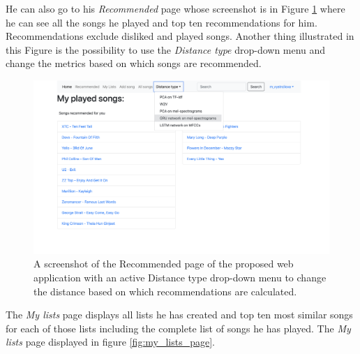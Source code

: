 He can also go to his \textit{Recommended} page whose screenshot is in Figure \ref{fig:recommended_page} where he can see all the songs he played and top ten recommendations for him. Recommendations exclude disliked and played songs. Another thing illustrated in this Figure is the possibility to use the \textit{Distance type} drop-down menu and change the metrics based on which songs are recommended.
\begin{figure}[H]
    \centering
	\includegraphics[width=1\linewidth]{./img/recommended_page.png}
	\caption{A screenshot of the Recommended page of the proposed web application with an active Distance type drop-down menu to change the distance based on which recommendations are calculated.}
	\label{fig:recommended_page}
\end{figure}
The \textit{My lists} page displays all lists he has created and top ten most similar songs for each of those lists including the complete list of songs he has played. The \textit{My lists} page displayed in figure \ref{fig:my_lists_page}.  \\
